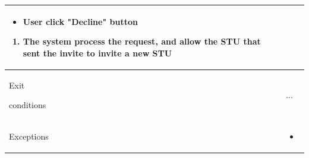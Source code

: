 \begin{center}
\begin{tabular}{| m{2cm} | m{10cm}|}
\begin{enumerate}
                                        \begin{itemize}
                                            \item User click "Decline" button
                                        \end{itemize} 
                                            \begin{enumerate}
                                                \item The system process the request, and allow the STU that sent the invite to invite a new STU
                                            \end{enumerate}
                                \end{enumerate}                      \\ \hline
        Exit \par conditions  & ...                                   \\ \hline
        Exceptions            & \begin{itemize}
                                    \item
                                \end{itemize}                        \\ \hline
    \end{tabular}
\end{center}

